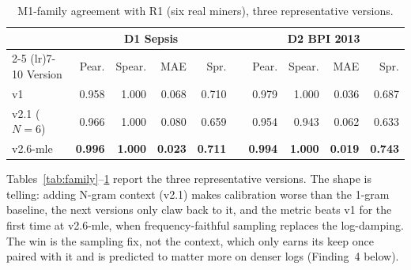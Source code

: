 \documentclass[runningheads]{llncs}
\begin{document}
\begin{table}[t]
\centering
\caption{M1-family agreement with R1 (six real miners), three representative versions.}
\label{tab:famcorr}
\setlength{\tabcolsep}{3.2pt}
\footnotesize
\begin{tabular}{@{}l rrrr c rrrr@{}}
\toprule
 & \multicolumn{4}{c}{D1 Sepsis} & & \multicolumn{4}{c}{D2 BPI 2013} \\
\cmidrule(lr){2-5} \cmidrule(lr){7-10}
Version & Pear. & Spear. & MAE & Spr. & & Pear. & Spear. & MAE & Spr. \\
\midrule
v1 & 0.958 & 1.000 & 0.068 & 0.710 & & 0.979 & 1.000 & 0.036 & 0.687 \\
v2.1 ($N{=}6$) & 0.966 & 1.000 & 0.080 & 0.659 & & 0.954 & 0.943 & 0.062 & 0.633 \\
v2.6-mle & \textbf{0.996} & \textbf{1.000} & \textbf{0.023} & \textbf{0.711} & & \textbf{0.994} & \textbf{1.000} & \textbf{0.019} & \textbf{0.743} \\
\bottomrule
\end{tabular}
\end{table}

Tables~\ref{tab:family}--\ref{tab:famcorr} report the three representative versions. The shape is telling: adding N-gram context (v2.1) makes calibration worse than the 1-gram baseline, the next versions only claw back to it, and the metric beats v1 for the first time at v2.6-mle, when frequency-faithful sampling replaces the log-damping. The win is the sampling fix, not the context, which only earns its keep once paired with it and is predicted to matter more on denser logs (Finding~4 below).
\end{document}

